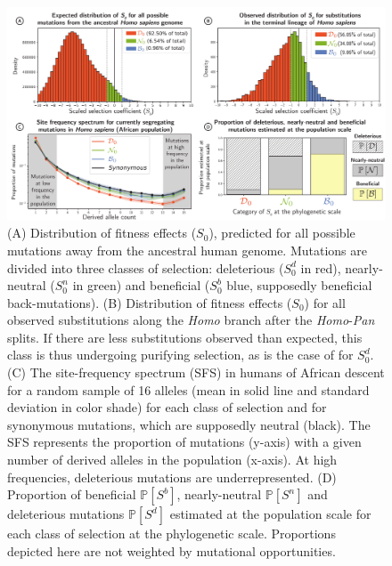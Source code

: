 \documentclass{article}
\newcommand{\proba}{\mathbb{P}}
\newcommand{\Sphy}{S_{0}}
\newcommand{\SphyDel}{\Sphy^{d}}
\newcommand{\SphyNeu}{\Sphy^{n}}
\newcommand{\SphyBen}{\Sphy^{b}}
\newcommand{\Spop}{S}
\newcommand{\SpopDel}{\Spop^{d}}
\newcommand{\SpopNeu}{\Spop^{n}}
\newcommand{\SpopBen}{\Spop^{b}}
\newcommand{\ProbaPopDel}{\proba [ \SpopDel]}
\newcommand{\ProbaPopNeu}{\proba [ \SpopNeu ]}
\newcommand{\ProbaPopBen}{\proba [ \SpopBen ]}
\begin{document}
    \begin{figure}[!ht]
        \centering
        \includegraphics[width=\textwidth, page=1] {artworks/figure.homo-afr-results}
        \caption{
            (A) Distribution of fitness effects ($\Sphy$), predicted for all possible mutations away from the ancestral human genome.
            Mutations are divided into three classes of selection: deleterious ($\SphyDel$ in red), nearly-neutral ($\SphyNeu$ in green) and beneficial ($\SphyBen$ blue, supposedly beneficial back-mutations).
            (B) Distribution of fitness effects ($\Sphy$) for all observed substitutions along the \textit{Homo} branch after the \textit{Homo}-\textit{Pan} splits.
            If there are less substitutions observed than expected, this class is thus undergoing purifying selection, as is the case of for $\SphyDel$.
            (C) The site-frequency spectrum (SFS) in humans of African descent for a random sample of 16 alleles (mean in solid line and standard deviation in color shade) for each class of selection and for synonymous mutations, which are supposedly neutral (black). The SFS represents the proportion of mutations (y-axis) with a given number of derived alleles in the population (x-axis).
            At high frequencies, deleterious mutations are underrepresented.
            (D) Proportion of beneficial $\ProbaPopBen$, nearly-neutral $\ProbaPopNeu$ and deleterious mutations $\ProbaPopDel$ estimated at the population scale for each class of selection at the phylogenetic scale. Proportions depicted here are not weighted by mutational opportunities.
        }
        \label{fig:homo-afr-results}
    \end{figure}
\end{document}
